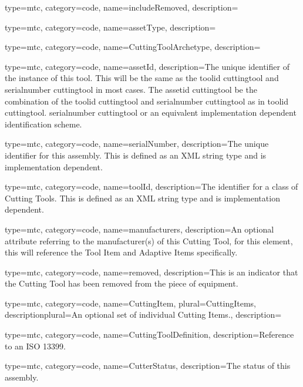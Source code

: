 {
  type=mtc,
  category=code,
  name={includeRemoved},
  description={}
}


{
  type=mtc,
  category=code,
  name={assetType},
  description={}
}


{
  type=mtc,
  category=code,
  name={CuttingToolArchetype},
  description={}
}


{
  type=mtc,
  category=code,
  name={assetId},
  description={The unique identifier of the instance of this tool. This will be the same as the \gls{toolid cuttingtool} and \gls{serialnumber cuttingtool} in most cases. The \gls{assetid cuttingtool} \SHOULD be the combination of the \gls{toolid cuttingtool} and \gls{serialnumber cuttingtool} as in \gls{toolid cuttingtool}. \gls{serialnumber cuttingtool} or an equivalent implementation dependent identification scheme.}
}


{
  type=mtc,
  category=code,
  name={serialNumber},
  description={The unique identifier for this assembly. This is defined as an XML string type and is implementation dependent.}
}


{
  type=mtc,
  category=code,
  name={toolId},
  description={The identifier for a class of Cutting Tools. This is defined as an XML string type and is implementation dependent. }
}


{
  type=mtc,
  category=code,
  name={manufacturers},
  description={An optional attribute referring to the manufacturer(s) of this Cutting Tool, for this element, this will reference the Tool Item and Adaptive Items specifically. }
}


{
  type=mtc,
  category=code,
  name={removed},
  description={This is an indicator that the Cutting Tool has been removed from the piece of equipment. }
}


{
  type=mtc,
  category=code,
  name={CuttingItem},
  plural={CuttingItems},
  descriptionplural={An optional set of individual Cutting Items.},
  description={}
}


{
  type=mtc,
  category=code,
  name={CuttingToolDefinition},
  description={Reference to an ISO 13399.}
}


{
  type=mtc,
  category=code,
  name={CutterStatus},
  description={The status of this assembly.}
}


